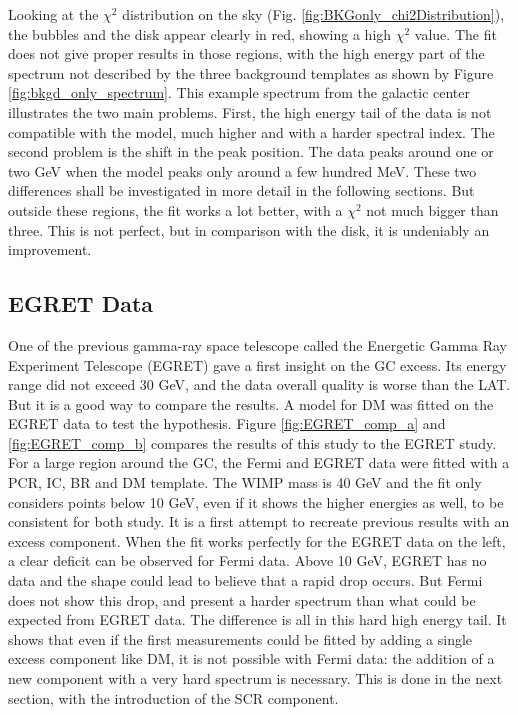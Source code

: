 Looking at the $\chi^2$ distribution on the sky (Fig. \ref{fig:BKGonly_chi2Distribution}), the bubbles and the disk appear clearly in red, showing a high $\chi^2$ value. The fit does not give proper results in those regions, with the high energy part of the spectrum not described by the three background templates as shown by Figure \ref{fig:bkgd_only_spectrum}. This example spectrum from the galactic center illustrates the two main problems. First, the high energy tail of the data is not compatible with the model, much higher and with a harder spectral index. The second problem is the shift in the peak position. The data peaks around one or two GeV when the model peaks only around a few hundred MeV. These two differences shall be investigated in more detail in the following sections.
But outside these regions, the fit works a lot better, with a $\chi^2$ not much bigger than three. This is not perfect, but in comparison with the disk, it is undeniably an improvement.



\subsection{EGRET Data}

One of the previous gamma-ray space telescope called the Energetic Gamma Ray Experiment Telescope (EGRET) gave a first insight on the GC excess. Its energy range did not exceed 30 GeV, and the data overall quality is worse than the LAT. But it is a good way to compare the results. A model for DM was fitted on the EGRET data to test the hypothesis. Figure \ref{fig:EGRET_comp_a} and \ref{fig:EGRET_comp_b} compares the results of this study to the EGRET study. For a large region around the GC, the Fermi and EGRET data were fitted with a PCR, IC, BR and DM template. The WIMP mass is 40 GeV and the fit only considers points below 10 GeV, even if it shows the higher energies as well, to be consistent for both study. It is a first attempt to recreate previous results with an excess component.
When the fit works perfectly for the EGRET data on the left, a clear deficit can be observed for Fermi data. Above 10 GeV, EGRET has no data and the shape could lead to believe that a rapid drop occurs. But Fermi does not show this drop, and present a harder spectrum than what could be expected from EGRET data. The difference is all in this hard high energy tail. It shows that even if the first measurements could be fitted by adding a single excess component like DM, it is not possible with Fermi data: the addition of a new component with a very hard spectrum is necessary. This is done in the next section, with the introduction of the SCR component.


